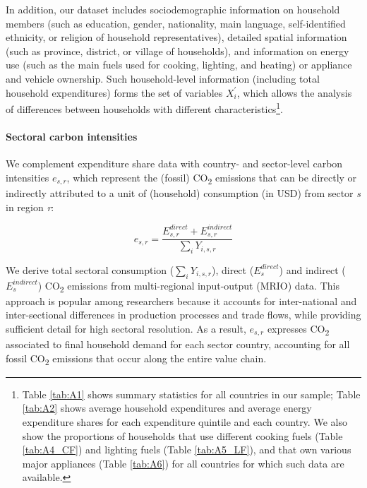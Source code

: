 \documentclass[12pt, a4paper]{article}
\begin{document}
In addition, our dataset includes sociodemographic information on household members (such as education, gender, nationality, main language, self-identified ethnicity, or religion of household representatives), detailed spatial information (such as province, district, or village of households), and information on energy use (such as the main fuels used for cooking, lighting, and heating) or appliance and vehicle ownership. Such household-level information (including total household expenditures) forms the set of variables $X_{i}^{'}$, which allows the analysis of differences between households with different characteristics\footnote{Table \ref{tab:A1} shows summary statistics for all countries in our sample; Table \ref{tab:A2} shows average household expenditures and average energy expenditure shares for each expenditure quintile and each country. We also show the proportions of households that use different cooking fuels (Table \ref{tab:A4_CF}) and lighting fuels (Table \ref{tab:A5_LF}), and that own various major appliances (Table \ref{tab:A6}) for all countries for which such data are available.}.

\paragraph{Sectoral carbon intensities} We complement expenditure share data with country- and sector-level carbon intensities $e_{s,r}$, which represent the (fossil) CO\textsubscript{2} emissions that can be directly or indirectly attributed to a unit of (household) consumption (in USD) from sector \textit{s} in region \textit{r}:

\begin{equation}
    e_{s,r} = \frac{E_{s,r}^{direct}+E_{s,r}^{indirect}}{\sum_{i} Y_{i,s,r}}
\end{equation}

We derive total sectoral consumption ($\sum_{i} Y_{i,s,r}$), direct ($E_{s}^{direct}$) and indirect ($E_{s}^{indirect}$) CO\textsubscript{2} emissions from  multi-regional input-output (MRIO) data. This approach is popular among researchers because it accounts for inter-national and inter-sectional differences in production processes and trade flows, while providing sufficient detail for high sectoral resolution. As a result, $e_{s,r}$ expresses CO\textsubscript{2} associated to final household demand for each sector country, accounting for all fossil CO\textsubscript{2} emissions that occur along the entire value chain.
\end{document}
